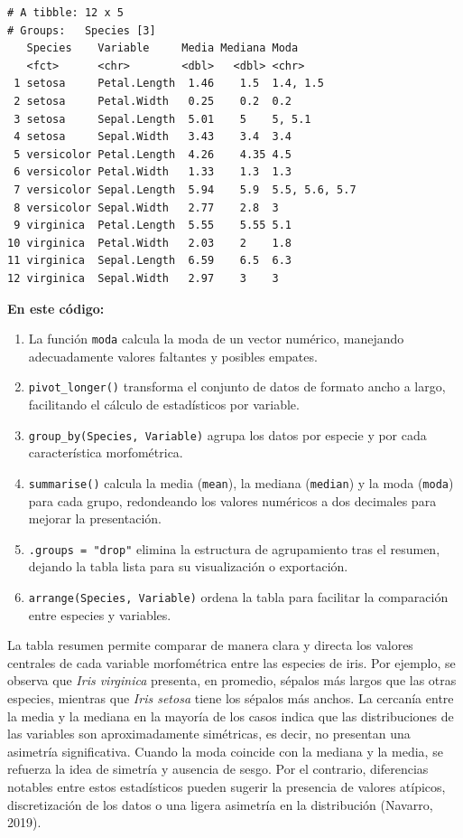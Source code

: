 \documentclass[
  spanish,
  a4paper,
  DIV=11,
  numbers=noendperiod,
  onepage,
  openany]{scrreprt}
\begin{document}
\begin{verbatim}
# A tibble: 12 x 5
# Groups:   Species [3]
   Species    Variable     Media Mediana Moda         
   <fct>      <chr>        <dbl>   <dbl> <chr>        
 1 setosa     Petal.Length  1.46    1.5  1.4, 1.5     
 2 setosa     Petal.Width   0.25    0.2  0.2          
 3 setosa     Sepal.Length  5.01    5    5, 5.1       
 4 setosa     Sepal.Width   3.43    3.4  3.4          
 5 versicolor Petal.Length  4.26    4.35 4.5          
 6 versicolor Petal.Width   1.33    1.3  1.3          
 7 versicolor Sepal.Length  5.94    5.9  5.5, 5.6, 5.7
 8 versicolor Sepal.Width   2.77    2.8  3            
 9 virginica  Petal.Length  5.55    5.55 5.1          
10 virginica  Petal.Width   2.03    2    1.8          
11 virginica  Sepal.Length  6.59    6.5  6.3          
12 virginica  Sepal.Width   2.97    3    3            
\end{verbatim}

\textbf{En este código:}

\begin{enumerate}
\def\labelenumi{\arabic{enumi}.}
\item
  La función \texttt{moda} calcula la moda de un vector numérico,
  manejando adecuadamente valores faltantes y posibles empates.
\item
  \texttt{pivot\_longer()} transforma el conjunto de datos de formato
  ancho a largo, facilitando el cálculo de estadísticos por variable.
\item
  \texttt{group\_by(Species,\ Variable)} agrupa los datos por especie y
  por cada característica morfométrica.
\item
  \texttt{summarise()} calcula la media (\texttt{mean}), la mediana
  (\texttt{median}) y la moda (\texttt{moda}) para cada grupo,
  redondeando los valores numéricos a dos decimales para mejorar la
  presentación.
\item
  \texttt{.groups\ =\ "drop"} elimina la estructura de agrupamiento tras
  el resumen, dejando la tabla lista para su visualización o
  exportación.
\item
  \texttt{arrange(Species,\ Variable)} ordena la tabla para facilitar la
  comparación entre especies y variables.
\end{enumerate}

La tabla resumen permite comparar de manera clara y directa los valores
centrales de cada variable morfométrica entre las especies de iris. Por
ejemplo, se observa que \emph{Iris virginica} presenta, en promedio,
sépalos más largos que las otras especies, mientras que \emph{Iris
setosa} tiene los sépalos más anchos. La cercanía entre la media y la
mediana en la mayoría de los casos indica que las distribuciones de las
variables son aproximadamente simétricas, es decir, no presentan una
asimetría significativa. Cuando la moda coincide con la mediana y la
media, se refuerza la idea de simetría y ausencia de sesgo. Por el
contrario, diferencias notables entre estos estadísticos pueden sugerir
la presencia de valores atípicos, discretización de los datos o una
ligera asimetría en la distribución (Navarro, 2019).
\end{document}
